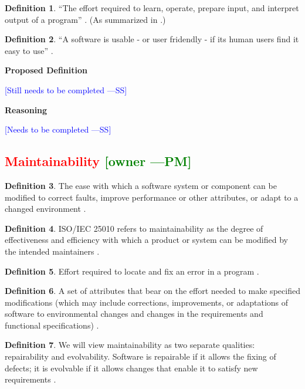 \documentclass[letterpaper,cleveref]{lipics-v2019}
\newcommand{\authornote}[3]{\textcolor{#1}{[#3 ---#2]}}
\newcommand{\authornote}[3]{}
\newcommand{\wss}[1]{\authornote{blue}{SS}{#1}} %
\newcommand{\pmi}[1]{\authornote{green}{PM}{#1}} %
\newcommand{\notdone}[1]{\textcolor{red}{#1}}
\theoremstyle{definition}
\newtheorem{defn}{Definition}
\begin{document}
\begin{defn}
  ``The effort required to learn, operate, prepare input, and interpret output
  of a program'' \citep{McCallEtAl1977}. (As summarized in
  \citet{VanVliet2000}.)
\end{defn}

\begin{defn}
  ``A software is usable - or user fridendly - if its human users find it easy
  to use'' \citep{ghezzi1991fundamentals}.
\end{defn}

\noindent \textbf{Proposed Definition}

\wss{Still needs to be completed}

\noindent \textbf{Reasoning}

\wss{Needs to be completed}

\subsection{\notdone{Maintainability} \pmi{owner}}

\begin{defn} \label{MaintainabilityDefnSelected1} 
  The ease with which a software system or component can be modified to correct
  faults, improve performance or other attributes, or adapt to a changed
  environment \citep{IEEEStdGlossarySET1990}.
\end{defn}

\begin{defn}
  ISO/IEC 25010 refers to maintainability as the degree of effectiveness and
  efficiency with which a product or system can be modified by the intended
  maintainers \citep{ISO/IEC25010}.
\end{defn}

\begin{defn}
  Effort required to locate and fix an error in a program
  \citep{pressman2005software}.
\end{defn}

\begin{defn}
  A set of attributes that bear on the effort needed to make specified
  modifications (which may include corrections, improvements, or adaptations of
  software to environmental changes and changes in the requirements and
  functional specifications) \citep{pfleeger2006software}.
\end{defn}

\begin{defn}
  We will view maintainability as two separate qualities: repairability and
  evolvability. Software is repairable if it allows the fixing of defects; it is
  evolvable if it allows changes that enable it to satisfy new requirements
  \citep{ghezzi1991fundamentals}.
\end{defn}
\end{document}
